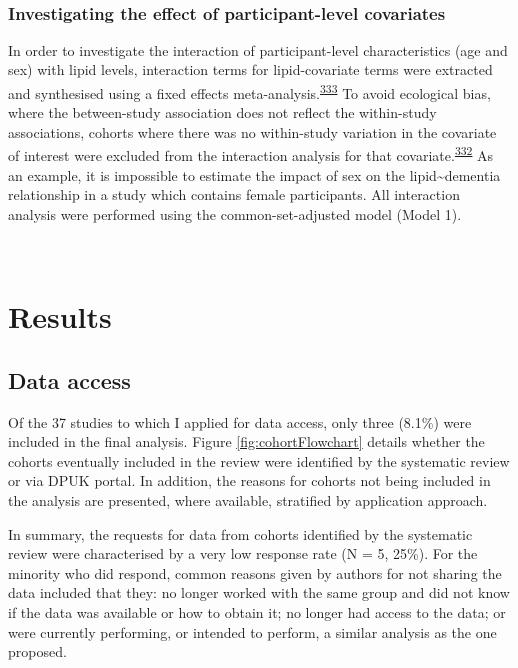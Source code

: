 \documentclass[a4paper, twoside]{templates/ociamthesis}
\begin{document}
~

\hypertarget{investigating-the-effect-of-participant-level-covariates}{%
\subsubsection{Investigating the effect of participant-level covariates}\label{investigating-the-effect-of-participant-level-covariates}}

In order to investigate the interaction of participant-level characteristics (age and sex) with lipid levels, interaction terms for lipid-covariate terms were extracted and synthesised using a fixed effects meta-analysis.\textsuperscript{\protect\hyperlink{ref-fisher2017}{333}} To avoid ecological bias, where the between-study association does not reflect the within-study associations, cohorts where there was no within-study variation in the covariate of interest were excluded from the interaction analysis for that covariate.\textsuperscript{\protect\hyperlink{ref-burke2017}{332}} As an example, it is impossible to estimate the impact of sex on the lipid\textasciitilde dementia relationship in a study which contains female participants. All interaction analysis were performed using the common-set-adjusted model (Model 1).

~

\hypertarget{results-1}{%
\section{Results}\label{results-1}}

\hypertarget{data-access}{%
\subsection{Data access}\label{data-access}}

Of the 37 studies to which I applied for data access, only three (8.1\%) were included in the final analysis. Figure \ref{fig:cohortFlowchart} details whether the cohorts eventually included in the review were identified by the systematic review or via DPUK portal. In addition, the reasons for cohorts not being included in the analysis are presented, where available, stratified by application approach.

In summary, the requests for data from cohorts identified by the systematic review were characterised by a very low response rate (N = 5, 25\%). For the minority who did respond, common reasons given by authors for not sharing the data included that they: no longer worked with the same group and did not know if the data was available or how to obtain it; no longer had access to the data; or were currently performing, or intended to perform, a similar analysis as the one proposed.
\end{document}

